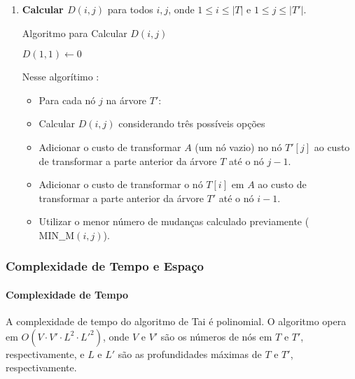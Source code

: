 \documentclass[12pt]{article}
\begin{document}
\begin{enumerate}
    \item \textbf{Calcular \( D(i, j) \)} para todos \( i, j \), onde \( 1 \leq i \leq |T| \) e \( 1 \leq j \leq |T'| \).

\begin{algorithm}[H]
\caption{Algoritmo para Calcular \( D(i, j) \)}
$D(1, 1) \leftarrow 0$\\

\end{algorithm}

Nesse algorítimo : 
\begin{itemize}
    \item Para cada nó \(j\) na árvore \(T'\):
    \item Calcular \(D(i, j)\) considerando três possíveis opções
    \item Adicionar o custo de transformar \(A\) (um nó vazio) no nó \(T'[j]\) ao custo de transformar a parte anterior da árvore \(T\) até o nó \(j-1\).
    \item Adicionar o custo de transformar o nó \(T[i]\) em \(A\) ao custo de transformar a parte anterior da árvore \(T'\) até o nó \(i-1\).
    \item Utilizar o menor número de mudanças calculado previamente (\( \text{MIN\_\_M}(i, j) \)).
\end{itemize}


\end{enumerate}

\subsubsection{Complexidade de Tempo e Espaço}

\paragraph{Complexidade de Tempo}

A complexidade de tempo do algoritmo de Tai é polinomial. O algoritmo opera em \( O(V \cdot V' \cdot L^2 \cdot L'^2) \), onde \( V \) e \( V' \) são os números de nós em \( T \) e \( T' \), respectivamente, e \( L \) e \( L' \) são as profundidades máximas de \( T \) e \( T' \), respectivamente.
\end{document}
